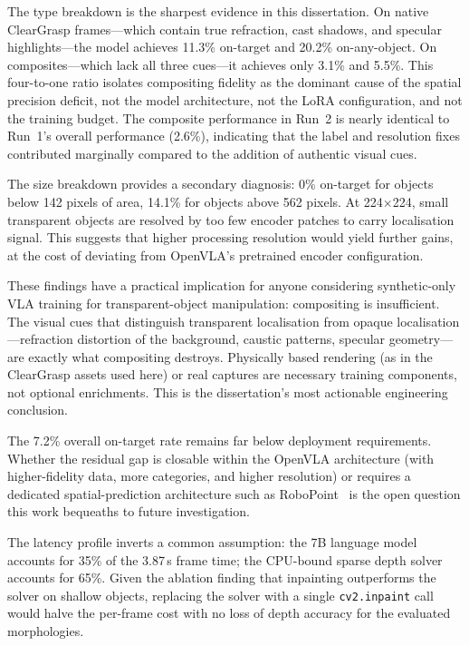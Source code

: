 The type breakdown is the sharpest evidence in this dissertation. On native
ClearGrasp frames---which contain true refraction, cast shadows, and
specular highlights---the model achieves 11.3\% on-target and 20.2\%
on-any-object. On composites---which lack all three cues---it achieves only
3.1\% and 5.5\%. This four-to-one ratio isolates compositing fidelity as
the dominant cause of the spatial precision deficit, not the model
architecture, not the LoRA configuration, and not the training budget. The
composite performance in Run~2 is nearly identical to Run~1's overall
performance (2.6\%), indicating that the label and resolution fixes
contributed marginally compared to the addition of authentic visual cues.
 
The size breakdown provides a secondary diagnosis: 0\% on-target for objects
below 142 pixels of area, 14.1\% for objects above 562 pixels. At 224$\times$224,
small transparent objects are resolved by too few encoder patches to carry
localisation signal. This suggests that higher processing resolution would
yield further gains, at the cost of deviating from OpenVLA's pretrained
encoder configuration.
 
These findings have a practical implication for anyone considering
synthetic-only VLA training for transparent-object manipulation: compositing
is insufficient. The visual cues that distinguish transparent localisation
from opaque localisation---refraction distortion of the background, caustic
patterns, specular geometry---are exactly what compositing destroys.
Physically based rendering (as in the ClearGrasp assets used here) or real
captures are necessary training components, not optional enrichments. This
is the dissertation's most actionable engineering conclusion.
 
The 7.2\% overall on-target rate remains far below deployment requirements.
Whether the residual gap is closable within the OpenVLA architecture (with
higher-fidelity data, more categories, and higher resolution) or requires a
dedicated spatial-prediction architecture such as
RoboPoint~\citep{yuan2024} is the open question this work bequeaths to
future investigation.
 
The latency profile inverts a common assumption: the 7B language model
accounts for 35\% of the 3.87\,s frame time; the CPU-bound sparse depth
solver accounts for 65\%. Given the ablation finding that inpainting
outperforms the solver on shallow objects, replacing the solver with a
single \texttt{cv2.inpaint} call would halve the per-frame cost with no
loss of depth accuracy for the evaluated morphologies.
 
